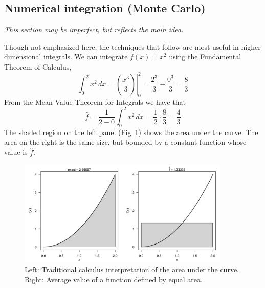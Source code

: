 \documentclass[11pt]{article}
\begin{document}
\clearpage
\subsection{Numerical integration (Monte Carlo)}
\textit{This section may be imperfect, but reflects the main idea.}

Though not emphasized here, the techniques that follow are most useful in higher dimensional integrals. We can integrate \(f(x) = x^2\) using the Fundamental Theorem of Calculus,
\[\int_0^2 x^2\,dx = \left.\left(\dfrac{x^3}{3}\right)\right|_0^2 = \dfrac{2^3}{3} - \dfrac{0^3}{3} = \dfrac{8}{3}\]
From the Mean Value Theorem for Integrals we have that \[\hat{f} = \dfrac{1}{2-0}\int_0^2 x^2\,dx = \dfrac{1}{2}\cdot \dfrac{8}{3} = \dfrac{4}{3}\]
The shaded region on the left panel (Fig~\ref{fig::calc}) shows the area under the curve. The area on the right is the same size, but bounded by a constant function whose value is \(\hat{f}\).

\begin{figure}[h!]\centering
\includegraphics[width=0.9\textwidth]{5_integration/intro.pdf}
\caption{Left: Traditional calculus interpretation of the area under the curve. Right: Average value of a function defined by equal area.}\label{fig::calc}
\end{figure}
\end{document}
